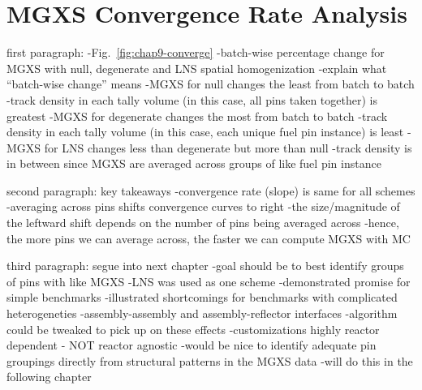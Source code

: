 \section{MGXS Convergence Rate Analysis}
\label{sec:chap9-convergence}

first paragraph: 
-Fig.~\ref{fig:chap9-converge}
  -batch-wise percentage change for \ac{MGXS} with null, degenerate and \ac{LNS} spatial homogenization
  -explain what ``batch-wise change'' means
-\ac{MGXS} for null changes the least from batch to batch
  -track density in each tally volume (in this case, all pins taken together) is greatest
-\ac{MGXS} for degenerate changes the most from batch to batch
  -track density in each tally volume (in this case, each unique fuel pin instance) is least
-\ac{MGXS} for \ac{LNS} changes less than degenerate but more than null
  -track density is in between since \ac{MGXS} are averaged across groups of like fuel pin instance

second paragraph: key takeaways
-convergence rate (slope) is same for all schemes
-averaging across pins shifts convergence curves to right
-the size/magnitude of the leftward shift depends on the number of pins being averaged across
-hence, the more pins we can average across, the faster we can compute \ac{MGXS} with \ac{MC}

third paragraph: segue into next chapter
-goal should be to best identify groups of pins with like \ac{MGXS}
-\ac{LNS} was used as one scheme
  -demonstrated promise for simple benchmarks
  -illustrated shortcomings for benchmarks with complicated heterogeneties
    -assembly-assembly and assembly-reflector interfaces
  -algorithm could be tweaked to pick up on these effects
    -customizations highly reactor dependent - NOT reactor agnostic
-would be nice to identify adequate pin groupings directly from structural patterns in the \ac{MGXS} data
-will do this in the following chapter

